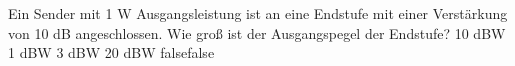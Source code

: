     {Ein Sender mit 1 W Ausgangsleistung ist an eine Endstufe mit einer Verstärkung von 10 dB angeschlossen. Wie groß ist der Ausgangspegel der Endstufe?}
    {10 dBW}
    {1 dBW}
    {3 dBW}
    {20 dBW}
    {false}{false}